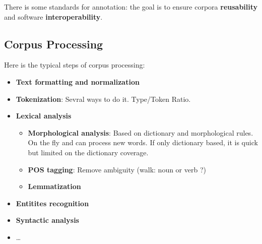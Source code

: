 There is some standards for annotation: the goal is to ensure corpora \textbf{reusability} and software \textbf{interoperability}.

\subsection{Corpus Processing}

Here is the typical steps of corpus processing:
\begin{itemize}
	\item \textbf{Text formatting and normalization}
	\item \textbf{Tokenization}: Sevral ways to do it. Type/Token Ratio.
	\item \textbf{Lexical analysis}
	\begin{itemize}
		\item \textbf{Morphological analysis}: Based on dictionary and morphological rules. On the fly and can process new words. If only dictionary based, it is quick but limited on the dictionary coverage.
		\item \textbf{POS tagging}: Remove ambiguity (walk: noun or verb ?)
		\item \textbf{Lemmatization}
	\end{itemize}
	\item \textbf{Entitites recognition}
	\item \textbf{Syntactic analysis}
	\item \dots
\end{itemize}
